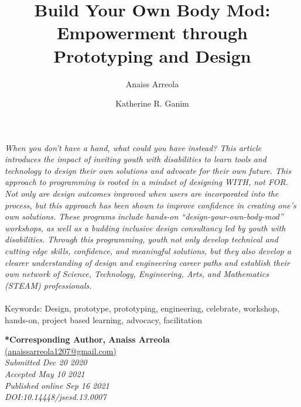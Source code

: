 \documentclass[11.5pt]{sig-alternate} %
\makeatletter
\let\oldabstract\abstract
\let\oldendabstract\endabstract
\renewenvironment{abstract} %
{\renewenvironment{quotation}%
               {\list{}{\addtolength{\leftmargin}{1em} %
                        \listparindent 1.5em%
                        \itemindent    \listparindent%
                        \rightmargin   \leftmargin%
                        \parsep        \z@ \@plus\p@}%
                \item\relax}%
               {\endlist}%
\oldabstract}
{\oldendabstract}
\makeatother
\begin{document}
\title{Build Your Own Body Mod: Empowerment through Prototyping and Design}

\author[1]{\large \color{blue}Anaiss Arreola}
\author[2]{\large \color{blue}Katherine R. Ganim}

\toappear{}
\maketitle
\begin{@twocolumnfalse} 
\begin{abstract}
\item 
 \textit {When you don’t have a hand, what could you have instead? This article introduces the impact of inviting youth with disabilities to learn tools and technology to design their own solutions and advocate for their own future. This approach to programming is rooted in a mindset of designing WITH, not FOR. Not only are design outcomes improved when users are incorporated into the process, but this approach has been shown to improve confidence in creating one’s own solutions. These programs include hands-on “design-your-own-body-mod” workshops, as well as a budding inclusive design consultancy led by youth with disabilities. Through this programming, youth not only develop technical and cutting edge skills, confidence, and meaningful solutions, but they also develop a clearer understanding of design and engineering career paths and establish their own network of Science, Technology, Engineering, Arts, and Mathematics (STEAM) professionals.}
     \\
     \\
     Keywords: Design, prototype, prototyping, engineering, celebrate, workshop, hands-on, project based learning, advocacy, facilitation
\end{abstract}
\end{@twocolumnfalse}


\textbf{*Corresponding Author, Anaiss Arreola }\\
\href{mailto: anaissarreola1207@gmail.com }{(anaissarreola1207@gmail.com)} \\
\textit{Submitted Dec 20 2020 }\\
\textit{Accepted May 10 2021} \\
\textit{Published online Sep 16 2021} \\
\textit{DOI:10.14448/jsesd.13.0007} \\
\pagebreak
\clearpage
\end{document}
